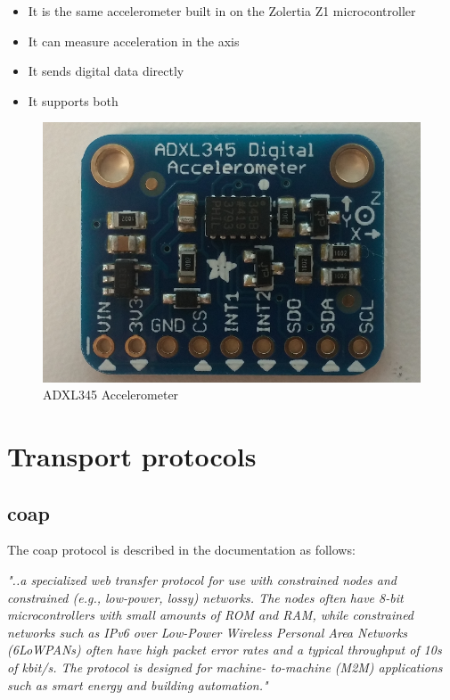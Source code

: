 \begin{itemize}
  \item It is the same accelerometer built in on the Zolertia Z1 microcontroller
  \item It can measure acceleration in the axis
  \item It sends digital data directly
  \item It supports both %
\end{itemize}


\begin{figure}[h]
    \centering
    \includegraphics[scale=0.32]{ADXL345.png}    \caption{ADXL345 Accelerometer}
    \label{fig:adxl345}
\end{figure}

\newpage

\section{Transport protocols}



\subsection{\gls{coap}}

The \gls{coap} protocol is described in the documentation as follows: 

\textit{"..a specialized web
   transfer protocol for use with constrained nodes and constrained
   (e.g., low-power, lossy) networks.  The nodes often have 8-bit
   microcontrollers with small amounts of ROM and RAM, while constrained
   networks such as IPv6 over Low-Power Wireless Personal Area Networks
   (6LoWPANs) often have high packet error rates and a typical
   throughput of 10s of kbit/s.  The protocol is designed for machine-
   to-machine (M2M) applications such as smart energy and building
   automation." } \cite{shelby2014constrained}
   



